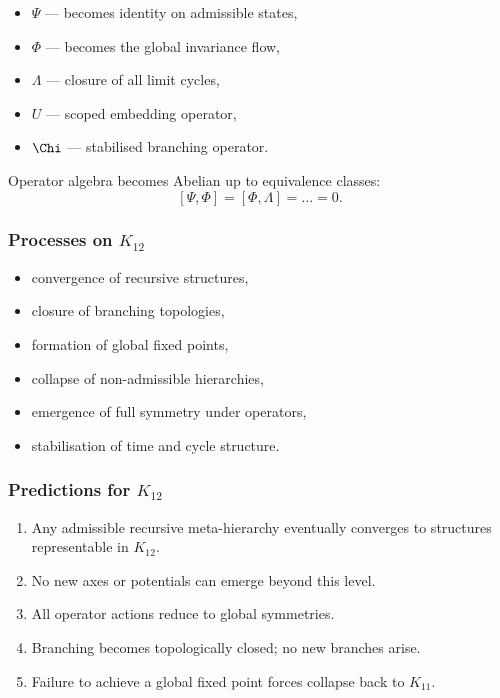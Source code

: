 \begin{itemize}
    \item $\Psi$ — becomes identity on admissible states,
    \item $\Phi$ — becomes the global invariance flow,
    \item $\Lambda$ — closure of all limit cycles,
    \item $U$ — scoped embedding operator,
    \item $\Chi$ — stabilised branching operator.
\end{itemize}

Operator algebra becomes Abelian up to equivalence classes:
\[
[\Psi,\Phi]=[\Phi,\Lambda]=\dots = 0.
\]

\subsubsection{Processes on $K_{12}$}

\begin{itemize}
    \item convergence of recursive structures,
    \item closure of branching topologies,
    \item formation of global fixed points,
    \item collapse of non-admissible hierarchies,
    \item emergence of full symmetry under operators,
    \item stabilisation of time and cycle structure.
\end{itemize}

\subsubsection{Predictions for $K_{12}$}

\begin{enumerate}
    \item Any admissible recursive meta-hierarchy eventually converges to
          structures representable in $K_{12}$.
    \item No new axes or potentials can emerge beyond this level.
    \item All operator actions reduce to global symmetries.
    \item Branching becomes topologically closed; no new branches arise.
    \item Failure to achieve a global fixed point forces collapse back to $K_{11}$.
\end{enumerate}

